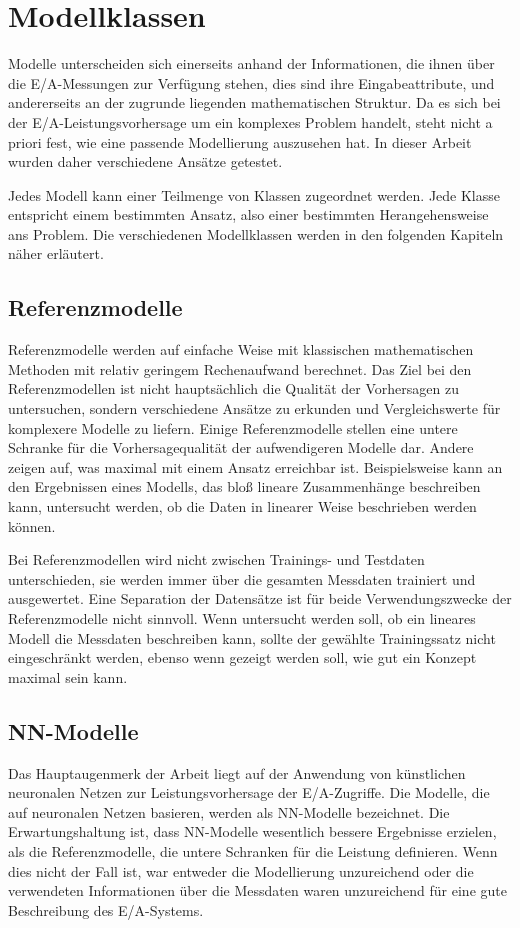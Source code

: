 \documentclass[
	12pt,
	a4paper,
	BCOR10mm,
	DIV14,
	listof=totoc,
	bibliography=totoc,
	headsepline
]{scrreprt}
\begin{document}
\section{Modellklassen}
\label{analyse:modellklassen}
Modelle unterscheiden sich einerseits anhand der Informationen, die ihnen über die E/A-Messungen zur Verfügung stehen, dies sind ihre Eingabeattribute, und andererseits an der zugrunde liegenden mathematischen Struktur.
Da es sich bei der E/A-Leistungsvorhersage um ein komplexes Problem handelt, steht nicht a priori fest, wie eine passende Modellierung auszusehen hat. 
In dieser Arbeit wurden daher verschiedene Ansätze getestet.

Jedes Modell kann einer Teilmenge von Klassen zugeordnet werden. Jede Klasse entspricht einem bestimmten Ansatz, also einer bestimmten Herangehensweise ans Problem.
Die verschiedenen Modellklassen werden in den folgenden Kapiteln näher erläutert.

\subsection{Referenzmodelle}
Referenzmodelle werden auf einfache Weise mit klassischen mathematischen Methoden mit relativ geringem Rechenaufwand berechnet.
Das Ziel bei den Referenzmodellen ist nicht hauptsächlich die Qualität der Vorhersagen zu untersuchen, sondern verschiedene Ansätze zu erkunden und Vergleichswerte für komplexere Modelle zu liefern.
Einige Referenzmodelle stellen eine untere Schranke für die Vorhersagequalität der aufwendigeren Modelle dar. Andere zeigen auf, was maximal mit einem Ansatz erreichbar ist.
Beispielsweise kann an den Ergebnissen eines Modells, das bloß lineare Zusammenhänge beschreiben kann, untersucht werden, ob die Daten in linearer Weise beschrieben werden können.\medskip

Bei Referenzmodellen wird nicht zwischen Trainings- und Testdaten unterschieden, sie werden immer über die gesamten Messdaten trainiert und ausgewertet.
Eine Separation der Datensätze ist für beide Verwendungszwecke der Referenzmodelle nicht sinnvoll. 
Wenn untersucht werden soll, ob ein lineares Modell die Messdaten beschreiben kann, sollte der gewählte Trainingssatz nicht eingeschränkt werden, ebenso wenn gezeigt werden soll, wie gut ein Konzept maximal sein kann.

\subsection{NN-Modelle}
Das Hauptaugenmerk der Arbeit liegt auf der Anwendung von künstlichen neuronalen Netzen zur Leistungsvorhersage der E/A-Zugriffe. Die Modelle, die auf neuronalen Netzen basieren, werden als NN-Modelle bezeichnet.
Die Erwartungshaltung ist, dass NN-Modelle wesentlich bessere Ergebnisse erzielen, als die Referenzmodelle, die untere Schranken für die Leistung definieren.
Wenn dies nicht der Fall ist, war entweder die Modellierung unzureichend oder die verwendeten Informationen über die Messdaten waren unzureichend für eine gute Beschreibung des E/A-Systems.\medskip
\end{document}
